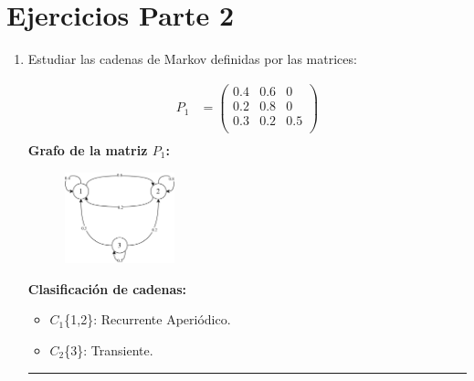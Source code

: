 \documentclass{templateNote}
\begin{document}
\newpage
\section{Ejercicios Parte 2}

\begin{enumerate}
    \item Estudiar las cadenas de Markov definidas por las matrices:
    
    \begin{align*}
        P_1 &= \left(
            \begin{array}{ccc}    
                0.4 & 0.6 & 0\\
                0.2 & 0.8 & 0\\
                0.3 & 0.2 & 0.5\\
            \end{array}
            \right)\\
    \end{align*}
    \textbf{Grafo de la matriz $P_1$:}
    \begin{figure}[H]
        \centering
        \includegraphics[width=0.3\textwidth]{img/ejer1_2.png}
    \end{figure}
    \textbf{Clasificación de cadenas:}
    \begin{itemize}
        \item $C_1$\{1,2\}: Recurrente Aperiódico.
        \item $C_2$\{3\}: Transiente.
    \end{itemize}

    \rule{0.8\textwidth}{0.4pt}


\end{enumerate}
\end{document}
